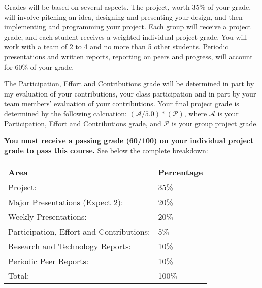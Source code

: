 Grades will be based on several aspects.
The project, worth 35\% of your grade, will involve pitching an idea, designing and presenting your design, and then implementing and programming your project. Each group will receive a project grade, and each student receives a weighted individual project grade.
You will work with a team of 2 to 4 and no more than 5 other students.
Periodic presentations and written reports, reporting on peers and progress, will account for 60\% of your grade.

The Participation, Effort and Contributions grade will be determined in part by my evaluation of your contributions, your class participation and in part by your team members' evaluation of your contributions.
Your final project grade is determined by the following calcuation: $(\mathcal{A}/5.0)*(\mathcal{P})$, where $\mathcal{A}$ is your Participation, Effort and Contributions grade, and $\mathcal{P}$ is your group project grade.

\textbf{You must receive a passing grade (60/100) on your individual project grade to pass this course.} See below the complete breakdown:

\par\vspace{1cm}
\begin{tabular}{ @{}ll@{} }
    \toprule
        Area & Percentage \\
    \midrule
        Project: & 35\% \\
        Major Presentations (Expect 2): & 20\% \\
        Weekly Presentations: & 20\% \\
        Participation, Effort and Contributions: & 5\% \\
        Research and Technology Reports: & 10\% \\
        Periodic Peer Reports: & 10\% \\
        Total: & 100\% \\
    \bottomrule
\end{tabular}